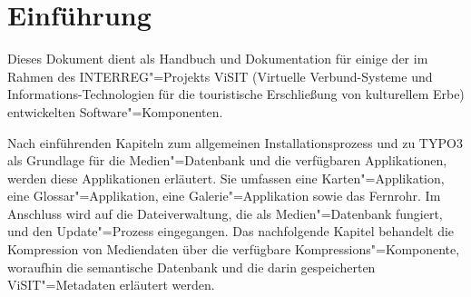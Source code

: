\documentclass[
10pt, %
a4paper, %
oneside, %
headinclude,footinclude, %
BCOR5mm, %
]{scrartcl}
\begin{document}

\begingroup

\let\thefootnote\relax{}

\let\thefootnote\relax{}

\let\thefootnote\relax{}

\endgroup

\newpage %


\section{Einführung}

Dieses Dokument dient als Handbuch und Dokumentation für einige der im Rahmen des INTERREG"=Projekts ViSIT (Virtuelle Verbund-Systeme und Informations-Technologien für die touristische Erschließung von kulturellem Erbe) entwickelten Software"=Komponenten.

Nach einführenden Kapiteln zum allgemeinen Installationsprozess und zu TYPO3 als Grundlage für die Medien"=Datenbank und die verfügbaren Applikationen, werden diese Applikationen erläutert. Sie umfassen eine Karten"=Applikation, eine Glossar"=Applikation, eine Galerie"=Applikation sowie das Fernrohr. Im Anschluss wird auf die Dateiverwaltung, die als Medien"=Datenbank fungiert, und den Update"=Prozess eingegangen. Das nachfolgende Kapitel behandelt die Kompression von Mediendaten über die verfügbare Kompressions"=Komponente, woraufhin die semantische Datenbank und die darin gespeicherten ViSIT"=Metadaten erläutert werden.








\printbibliography






\end{document}
